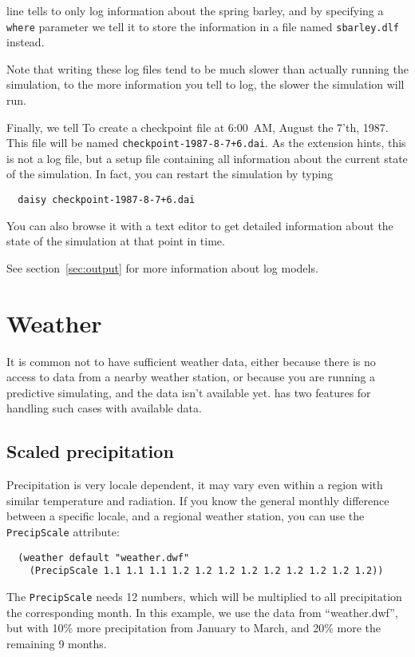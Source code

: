 \documentclass[a4paper,11pt]{article}
\begin{document}
line tells \daisy{} to only log information about the spring barley,
and by specifying a \texttt{where} parameter we tell it to store the
information in a file named \texttt{sbarley.dlf} instead.

Note that writing these log files tend to be much slower than actually
running the simulation, to the more information you tell \daisy{} to
log, the slower the simulation will run.

Finally, we tell \daisy{} To create a checkpoint file at 6:00~AM,
August the 7'th, 1987.  This file will be named
\texttt{checkpoint-1987-8-7+6.dai}.  As the extension hints, this is
not a log file, but a setup file containing all information about the
current state of the simulation.  In fact, you can restart the
simulation by typing
\begin{verbatim}
  daisy checkpoint-1987-8-7+6.dai
\end{verbatim}
You can also browse it with a text editor to get detailed information
about the state of the simulation at that point in time.

See section~\ref{sec:output} for more information about log models.


\section{Weather}
\label{sec:weather}

It is common not to have sufficient weather data, either because there
is no access to data from a nearby weather station, or because you are
running a predictive simulating, and the data isn't available yet.
\Daisy{} has two features for handling such cases with available
data.  

\subsection{Scaled precipitation}

Precipitation is very locale dependent, it may vary even within a
region with similar temperature and radiation.  If you know the
general monthly difference between a specific locale, and a regional
weather station, you can use the \texttt{PrecipScale} attribute:
\begin{verbatim}
  (weather default "weather.dwf"
    (PrecipScale 1.1 1.1 1.1 1.2 1.2 1.2 1.2 1.2 1.2 1.2 1.2 1.2))
\end{verbatim}
The \texttt{PrecipScale} needs 12 numbers, which will be multiplied to
all precipitation the corresponding month.  In this example, we use
the data from ``weather.dwf'', but with 10\% more precipitation from
January to March, and 20\% more the remaining 9 months.
\end{document}
